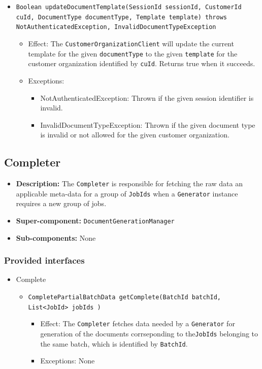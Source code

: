 \documentclass[a4paper,10pt]{article}
\begin{document}
\begin{itemize}
\begin{itemize}
   	\item \texttt{Boolean updateDocumentTemplate(SessionId sessionId, CustomerId cuId, DocumentType documentType, Template template) throws NotAuthenticatedException, InvalidDocumentTypeException}
        \begin{itemize}
            \item Effect: The \texttt{CustomerOrganizationClient} will update the current template for the given \texttt{documentType} to the given \texttt{template} for the customer organization identified by \texttt{cuId}. Returns true when it succeeds.
            \item Exceptions:
            \begin{itemize}
            	\item NotAuthenticatedException: Thrown if the given session identifier is invalid.
            	\item InvalidDocumentTypeException: Thrown if the given document type is invalid or not allowed for the given customer organization.
            \end{itemize}
        \end{itemize}        
    \end{itemize}
\end{itemize}




\subsection{Completer}
\begin{itemize}
    \item \textbf{Description:} The \texttt{Completer} is responsible for fetching the raw data an applicable meta-data for a group of \texttt{JobIds} when a \texttt{Generator} instance requires a new group of jobs.
    \item \textbf{Super-component:} \texttt{DocumentGenerationManager}
    \item \textbf{Sub-components:} None
\end{itemize}

\subsubsection*{Provided interfaces}
\begin{itemize}
    \item Complete
    \begin{itemize}
        \item \texttt{CompletePartialBatchData getComplete(BatchId batchId, List<JobId> jobIds )}
        \begin{itemize}
            \item Effect: The \texttt{Completer} fetches data needed by a \texttt{Generator} for generation of the documents corrseponding to the\texttt{JobIds} belonging to the same batch, which is identified by \texttt{BatchId}.
            \item Exceptions: None
        \end{itemize}
    \end{itemize}
\end{itemize}
\end{document}
